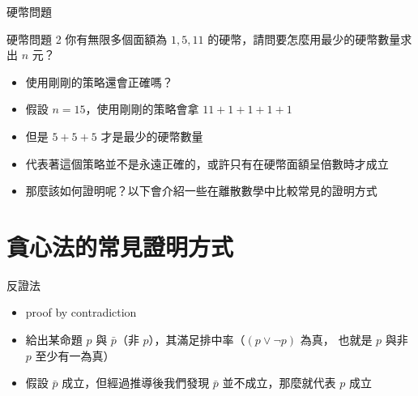 \documentclass[aspectratio=169]{beamer}
\begin{document}
    \begin{frame}{硬幣問題}
        \begin{block}{硬幣問題 2}
            你有無限多個面額為 $1, 5, 11$ 的硬幣，請問要怎麼用最少的硬幣數量求出 $n$ 元？
        \end{block}

        \begin{itemize}
            \item<1-> 使用剛剛的策略還會正確嗎？
            \item<2-> 假設 $n = 15$，使用剛剛的策略會拿 $11 + 1 + 1 + 1 + 1$
            \item<2-> 但是 $5 + 5 + 5$ 才是最少的硬幣數量
            \item<3-> 代表著這個策略並不是永遠正確的，或許只有在硬幣面額呈倍數時才成立
            \item<4-> 那麼該如何證明呢？以下會介紹一些在離散數學中比較常見的證明方式
        \end{itemize}
    \end{frame}

    \section{貪心法的常見證明方式}

    \begin{frame}{反證法}
        \begin{itemize}
            \item<1-> proof by contradiction
            \item<1-> 給出某命題 $p$ 與 $\bar{p}$（非 $p$），其滿足排中率（${\displaystyle (p\vee \neg p)}$ 為真，
            也就是 $p$ 與非 $p$ 至少有一為真）
            \item<2-> 假設 $\bar{p}$ 成立，但經過推導後我們發現 $\bar{p}$ 並不成立，那麼就代表 $p$ 成立
        \end{itemize}
    \end{frame}
\end{document}
